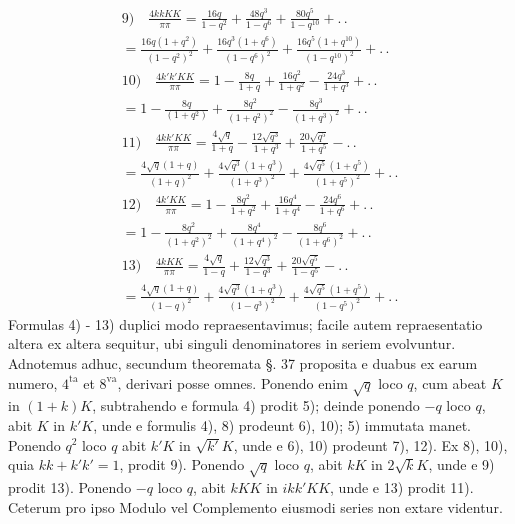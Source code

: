 \documentclass{article}
\begin{document}
\[
\begin{gathered}
\text{9)}\quad\frac{4kkKK}{\pi\pi}=\frac{16q}{1-q^{2}}+\frac{48q^{3}}{1-q^{6}}+\frac{80q^{5}}{1-q^{10}}+.\,.\\[2ex]
=\frac{16q(1+q^{2})}{(1-q^{2})^{2}}+\frac{16q^{3}(1+q^{6})}{(1-q^{6})^{2}}+\frac{16q^{5}(1+q^{10})}{(1-q^{10})^{2}}+.\,.\\[2ex]
\text{10)}\quad\frac{4k'k'KK}{\pi\pi}=1-\frac{8q}{1+q}+\frac{16q^{2}}{1+q^{2}}-\frac{24q^{3}}{1+q^{3}}+.\,.\\[2ex]
=1-\frac{8q}{(1+q^{2})}+\frac{8q^{2}}{(1+q^{2})^{2}}-\frac{8q^{3}}{(1+q^{3})^{2}}+.\,.\\[2ex]
\text{11)}\quad\frac{4kk'KK}{\pi\pi}=\frac{4\sqrt{q}}{1+q}-\frac{12\sqrt{q^{3}}}{1+q^{3}}+\frac{20\sqrt{q^{5}}}{1+q^{5}}-.\,.\\[2ex]
=\frac{4\sqrt{q}(1+q)}{(1+q)^{2}}+\frac{4\sqrt{q^{3}}(1+q^{3})}{(1+q^{3})^{2}}+\frac{4\sqrt{q^{5}}(1+q^{5})}{(1+q^{5})^{2}}+.\,.\\[2ex]
\text{12)}\quad\frac{4k'KK}{\pi\pi}=1-\frac{8q^{2}}{1+q^{2}}+\frac{16q^{4}}{1+q^{4}}-\frac{24q^{6}}{1+q^{6}}+.\,.\\[2ex]
=1-\frac{8q^{2}}{(1+q^{2})^{2}}+\frac{8q^{4}}{(1+q^{4})^{2}}-\frac{8q^{6}}{(1+q^{6})^{2}}+.\,.\\[2ex]
\text{13)}\quad\frac{4kKK}{\pi\pi}=\frac{4\sqrt{q}}{1-q}+\frac{12\sqrt{q^{3}}}{1-q^{3}}+\frac{20\sqrt{q^{5}}}{1-q^{5}}-.\,.\\[2ex]
=\frac{4\sqrt{q}(1+q)}{(1-q)^{2}}+\frac{4\sqrt{q^{3}}(1+q^{3})}{(1-q^{3})^{2}}+\frac{4\sqrt{q^{5}}(1+q^{5})}{(1-q^{5})^{2}}+.\,.
\end{gathered}
\]
Formulas 4) - 13) duplici modo repraesentavimus; facile autem repraesentatio altera ex altera sequitur, ubi singuli denominatores in seriem evolvuntur. Adnotemus adhuc, secundum theoremata §. 37 proposita e duabus ex earum numero, $4^{\mathrm{ta}}$ et $8^{\mathrm{va}}$, derivari posse omnes. Ponendo enim $\sqrt{q}$ loco $q$, cum abeat $K$ in $(1+k)K$, subtrahendo e formula 4) prodit 5); deinde ponendo $-q$ loco $q$, abit $K$ in $k'K$, unde e formulis 4), 8) prodeunt 6), 10); 5) immutata manet. Ponendo $q^{2}$ loco $q$ abit $k'K$ in $\sqrt{k'}K$, unde e 6), 10) prodeunt 7), 12). Ex 8), 10), quia $kk+k'k'=1$, prodit 9). Ponendo $\sqrt{q}$ loco $q$, abit $kK$ in $2\sqrt{k}K$, unde e 9) prodit 13). Ponendo $-q$ loco $q$, abit $kKK$ in $ikk'KK$, unde e 13) prodit 11). Ceterum pro ipso Modulo vel Complemento eiusmodi series non extare videntur.
\end{document}
